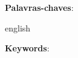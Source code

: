 
\setlength{\absparsep}{18pt} %
\begin{resumo}

 \textbf{Palavras-chaves}: 
\end{resumo}

\begin{resumo}[Abstract]
 \begin{otherlanguage*}{english}
 
   \vspace{\onelineskip}
 
   \noindent 
   \textbf{Keywords}: 
 \end{otherlanguage*}
\end{resumo}
